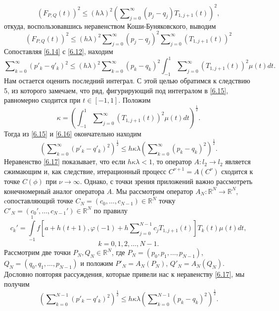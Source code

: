  \begin{equation}\label{6.14}
(F_{P,Q}(t))^2\le (h\lambda)^2   \left(\sum\nolimits_{j=0}^\infty( p_j-q_j)T_{1,j+1}(t)\right)^2,
\end{equation}
откуда,  воспользовавшись неравенством Коши-Буняковского, выводим
$$
(F_{P,Q}(t))^2\le(h\lambda)^2   \sum\nolimits_{j=0}^\infty( p_j-q_j)^2\sum\nolimits_{j=0}^\infty(T_{1,j+1}(t))^2
$$
Сопоставляя \eqref{6.14} с \eqref{6.12}, находим
\begin{equation}\label{6.15}
\sum\nolimits_{k=0}^\infty (p'_k-q'_k)^2\le(h\lambda)^2 \sum\nolimits_{k=0}^\infty( p_k-q_k)^2\int_{-1}^1 \sum\nolimits_{j=0}^\infty(T_{1,j+1}(t))^2   \mu(t)dt.
\end{equation}
Нам остается оценить последний интеграл. С этой целью обратимся к следствию 5, из которого замечаем, что ряд, фигурирующий под интегралом в \eqref{6.15}, равномерно сходится при $t\in[-1,1]$. Положим
\begin{equation}\label{6.16}
\kappa=\left(\int_{-1}^1\sum\nolimits_{j=0}^\infty(T_{1,j+1}(t))^2\mu(t)dt\right)^\frac12.
\end{equation}
Тогда из \eqref{6.15} и \eqref{6.16} окончательно находим
\begin{equation}\label{6.17}
\left(\sum\nolimits_{k=0}^\infty (p'_k-q'_k)^2\right)^\frac12\le h\kappa\lambda \left(\sum\nolimits_{k=0}^\infty (p_k-q_k)^2\right)^\frac12. \end{equation}
Неравенство \eqref{6.17} показывает, что если $h\kappa\lambda<1$, то оператор  $A:l_2\to l_2$ является сжимающим и, как следствие, итерационный процесс $C^{\nu+1}=A(C^{\nu})$  сходится к точке $C(\phi)$ при $\nu\to\infty$. Однако, с точки зрения приложений важно рассмотреть конечномерный аналог оператора $A$. Мы рассмотрим оператор $A_N:\mathbb{R}^N\to \mathbb{R}^N$, cопоставляющий точке
$C_N=(c_0,\ldots,c_{N-1})\in \mathbb{R}^N $ точку  $C'_N=(c_0',\ldots,c_{N-1}')\in \mathbb{R}^N $ по правилу
\begin{equation}\label{6.18}
c_k'=\int\limits_{-1}^1f\left[a+h(t+1),\varphi(-1)+ h\sum\nolimits_{j=0}^{N-1} c_jT_{1,j+1}(t)\right]T_k(t) \mu(t)dt,
\end{equation}
$$
k=0,1,2,\ldots, N-1.
$$
 Рассмотрим две точки $P_N,Q_N\in \mathbb{R}^N$, где $P_N=(p_0,p_1,\ldots,p_{N-1})$,\\   $Q_N=(q_0,q_1,\ldots,p_{N-1})$ и положим $P'_N=A_N(P_N)$, $Q'_N=A_N(Q_N)$. Дословно повторяя рассуждения, которые привели нас к неравенству \eqref{6.17}, мы получим
\begin{equation}\label{6.19}
\left(\sum\nolimits_{k=0}^{N-1} (p'_k-q'_k)^2\right)^\frac12\le h\kappa\lambda \left(\sum\nolimits_{k=0}^{N-1} (p_k-q_k)^2\right)^\frac12.
\end{equation}
